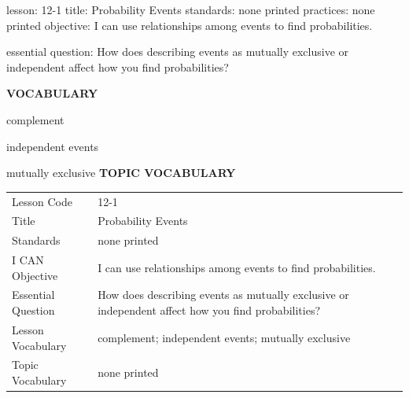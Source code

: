 \documentclass{article}
\newenvironment{lesson-meta}{}{}        %
\newcommand{\te}[1]{}                   %
\begin{document}
\begin{lesson-meta}
lesson: 12-1
title: Probability Events
standards: none printed
practices: none printed
objective: I can use relationships among events to find probabilities.

essential question: How does describing events as mutually exclusive or independent affect how you find probabilities?

\textbf{VOCABULARY}
\item complement
\item independent events
\item mutually exclusive
\textbf{TOPIC VOCABULARY}
\te{No separate topic vocabulary list is printed on these pages.}
\begin{tabular}{ll}
Lesson Code & 12-1 \\
Title & Probability Events \\
Standards & none printed \\
I CAN Objective & I can use relationships among events to find probabilities. \\
Essential Question & How does describing events as mutually exclusive or independent affect how you find probabilities? \\
Lesson Vocabulary & complement; independent events; mutually exclusive \\
Topic Vocabulary & none printed \\
\end{tabular}
\end{lesson-meta}
\end{document}
